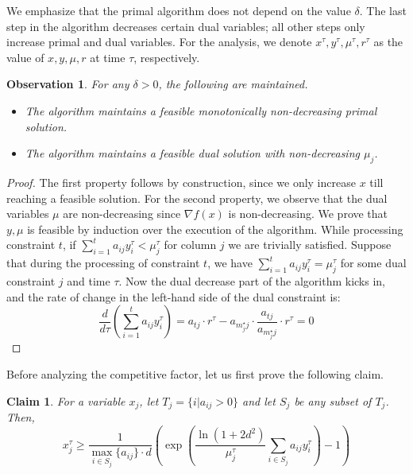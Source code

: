 \documentclass[letterpaper,11pt]{article}
\newtheorem{obs}[thm]{Observation}
\newtheorem{claim}[thm]{Claim}
\begin{document}
We emphasize that the primal algorithm does not depend on the value $\delta$. The last step in the algorithm decreases certain dual variables; all other steps only increase primal and dual variables. For the analysis, we denote $x^{\tau},y^{\tau},\mu^{\tau},r^{\tau}$ as the value of $x,y,\mu,r$ at time $\tau$, respectively.

\begin{obs}
For any $\delta>0$, the following are maintained.
\begin{itemize}
\item The algorithm maintains a feasible monotonically non-decreasing primal solution.
\item The algorithm maintains a feasible dual solution with non-decreasing $\mu_j$.
\end{itemize}
\end{obs}

\begin{proof}
The first property follows by construction, since we only increase $x$ till reaching a feasible solution.
For the second property, we observe that the dual variables $\mu$ are non-decreasing since $\nabla f(x)$ is non-decreasing.
We prove that $y,\mu$ is feasible  by induction over the execution of the algorithm.
While processing constraint $t$, if $\sum_{i=1}^{t}a_{ij}y^{\tau}_i < \mu^{\tau}_j$ for column $j$ we are trivially satisfied. Suppose that during the processing of constraint $t$, we have $\sum_{i=1}^{t}a_{ij}y^{\tau}_i = \mu^{\tau}_j$ for some dual constraint $j$ and time $\tau$. Now the dual decrease part of the algorithm kicks in, and the rate of change in the left-hand side of the dual constraint is:
\[ \frac{d}{d \tau} \left(\sum_{i=1}^{t}a_{ij}y^{\tau}_i\right) = a_{t j} \cdot r^{\tau} - a_{m^\star_j j} \cdot \frac{a_{t j}}{a_{m^\star_j j}}\cdot r^{\tau}=0
 \]
\end{proof}

Before analyzing the competitive factor, let us first prove the following claim.

\begin{claim}\label{x_lower}
For a variable $x_j$, let $T_j=\{i | a_{ij}>0\}$ and let $S_j$ be any subset of $T_j$. Then,
\begin{equation}x^{\tau}_j \geq \frac{1}{\max_{i\in S_j}\{a_{ij}\}\cdot d}\left(\exp\left(\frac{\ln\left(1+2d^2\right)}{\mu_j^{\tau}}\sum_{i\in S_j}a_{ij}y^{\tau}_i\right)-1\right)\end{equation}
\end{claim}
\end{document}

